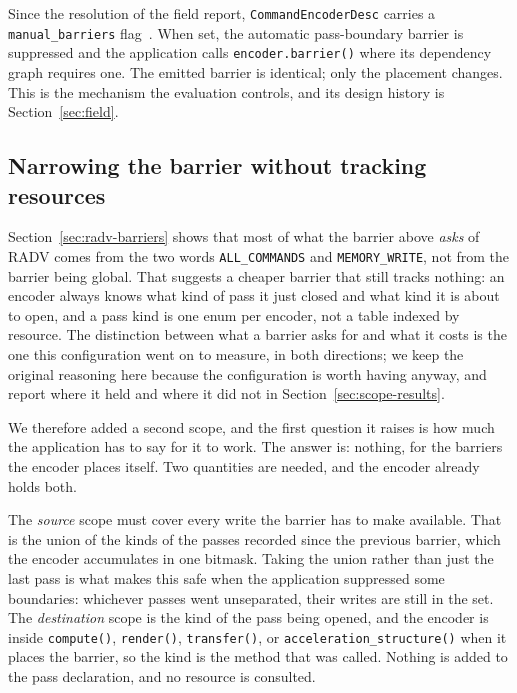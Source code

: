 \documentclass[10pt,twocolumn]{article}
\begin{document}
Since the resolution of the field report, \texttt{CommandEncoderDesc} carries a
\texttt{manual\_barriers} flag~\cite{blade-pr-355}. When set, the automatic pass-boundary barrier
is suppressed and the application calls \texttt{encoder.barrier()} where its
dependency graph requires one. The emitted barrier is identical; only the
placement changes. This is the mechanism the evaluation controls, and its
design history is Section~\ref{sec:field}.

\subsection{Narrowing the barrier without tracking resources}
\label{sec:scoped}

Section~\ref{sec:radv-barriers} shows that most of what the barrier above
\emph{asks} of RADV comes from the two words \texttt{ALL\_COMMANDS} and
\texttt{MEMORY\_WRITE}, not from the barrier being global. That suggests a
cheaper barrier that still tracks nothing: an encoder always knows what kind of
pass it just closed and what kind it is about to open, and a pass kind is one
enum per encoder, not a table indexed by resource. The distinction between what
a barrier asks for and what it costs is the one this configuration went on to
measure, in both directions; we keep the original reasoning here because the
configuration is worth having anyway, and report where it held and where it
did not in Section~\ref{sec:scope-results}.

We therefore added a second scope, and the first question it raises is how
much the application has to say for it to work. The answer is: nothing, for
the barriers the encoder places itself. Two quantities are needed, and the
encoder already holds both.

The \emph{source} scope must cover every write the barrier has to make
available. That is the union of the kinds of the passes recorded since the
previous barrier, which the encoder accumulates in one bitmask. Taking the
union rather than just the last pass is what makes this safe when the
application suppressed some boundaries: whichever passes went unseparated,
their writes are still in the set. The \emph{destination} scope is the kind of
the pass being opened, and the encoder is inside \texttt{compute()},
\texttt{render()}, \texttt{transfer()}, or
\texttt{acceleration\_structure()} when it places the barrier, so the kind is
the method that was called. Nothing is added to the pass declaration, and no
resource is consulted.
\end{document}
